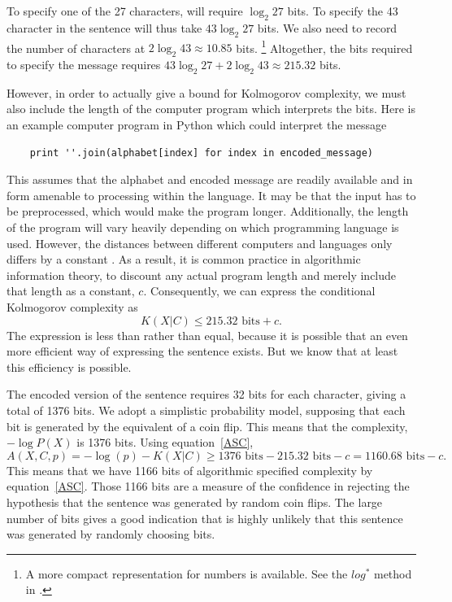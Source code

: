 To specify one of the 27 characters, will require $\log_2 27$ bits. 
To specify the 43 character in the sentence will thus take $43 \log_2 27$ bits.
We also need to record the number of characters at $2 \log_2 43 \approx 10.85$ bits. 
\footnote{A more compact representation for numbers is available. See the $log^*$ method in \citet{Cover2006}.}
Altogether, the bits required to specify the message requires $43 \log_2 27 + 2 \log_2 43 \approx 215.32$ bits. 


However, in order to actually give a bound for Kolmogorov complexity, we must also include the length of the computer program which interprets the bits.
Here is an example computer program in Python which could interpret the message
\begin{verbatim}
    print ''.join(alphabet[index] for index in encoded_message)
\end{verbatim}
This assumes that the alphabet and encoded message are readily available and in form amenable to processing within the language.
It may be that the input has to be preprocessed, which would make the program longer.
Additionally, the length of the program will vary heavily depending on which programming language is used.
However, the distances between different computers and languages only differs by a constant \citep{Cover2006}.
As a result, it is common practice in algorithmic information theory, to discount any actual program length and merely include that length 
as a constant, $c$. 
Consequently, we can express the conditional Kolmogorov complexity as 
\begin{equation}
    \label{kc.alpha}
    K(X|C) \leq 215.32 \mbox{ bits} + c \mbox{.}
\end{equation}
The expression is less than rather than equal, because it is possible that an even more efficient way of expressing the sentence exists.
But we know that at least this efficiency is possible.

The encoded version of the sentence requires 32 bits for each character, giving a total of 1376 bits.
We adopt a simplistic probability model, supposing that each bit is generated by the equivalent of a coin flip.
This means that the complexity, $-\log P(X)$ is 1376 bits.
Using equation~\ref{ASC},
\begin{equation}
    A(X,C,p) = -\log(p) - K(X|C) \geq 1376 \mbox{ bits} - 215.32 \mbox{ bits} - c  = 1160.68 \mbox{ bits} - c \mbox{.}
\end{equation}
This means that we have 1166 bits of algorithmic specified complexity by equation~\ref{ASC}.
Those 1166 bits are a measure of the confidence in rejecting the hypothesis that the sentence was generated by random coin flips.
The large number of bits gives a good indication that is highly unlikely that this sentence was generated by randomly choosing bits.

